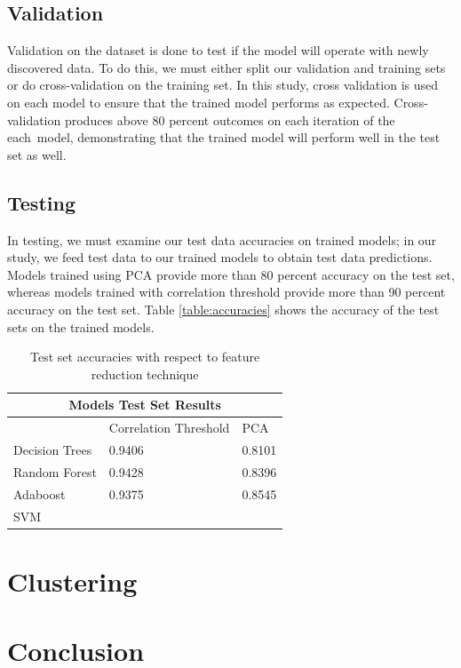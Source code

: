 \documentclass[12pt]{article}
\begin{document}
\subsection{Validation}
Validation on the dataset is done to test if the model will operate with newly discovered data. To do this, we must either split our validation and training sets or do cross-validation on the training set. In this study, cross validation is used on each model to ensure that the trained model performs as expected. Cross-validation produces above 80 percent outcomes on each iteration of the each model, demonstrating that the trained model will perform well in the test set as well.

\subsection{Testing}
In testing, we must examine our test data accuracies on trained models; in our study, we feed test data to our trained models to obtain test data predictions. Models trained using PCA provide more than 80 percent accuracy on the test set, whereas models trained with correlation threshold provide more than 90 percent accuracy on the test set. Table \ref{table:accuracies} shows the accuracy of the test sets on the trained models.
\begin{table}[h!]
	\centering
	\begin{tabular}{ |p{3cm}|p{3cm}|p{3cm}|  }
		\hline
		\multicolumn{3}{|c|}{Models Test Set Results} \\
		\hline
		& Correlation Threshold & PCA \\
		\hline
		Decision Trees & 0.9406 &0.8101 \\
		Random Forest & 0.9428   & 0.8396 \\
		Adaboost &0.9375 & 0.8545 \\
		SVM    & &  \\
		\hline
	\end{tabular}
	\caption{Test set accuracies with respect to feature reduction technique}
	\label{table:test_accuracies}
\end{table}

\section{Clustering}


\section{Conclusion}


\singlespacing



\end{document}
